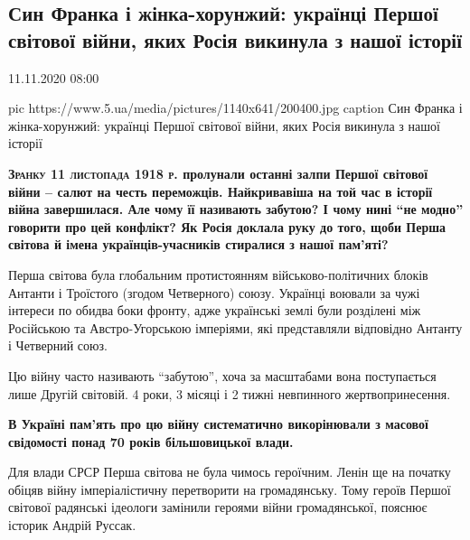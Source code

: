  
 
 

\subsection{Син Франка і жінка-хорунжий: українці Першої світової війни, яких Росія викинула з нашої історії}
11.11.2020 08:00



\ifcmt
pic https://www.5.ua/media/pictures/1140x641/200400.jpg
caption Син Франка і жінка-хорунжий: українці Першої світової війни, яких Росія викинула з нашої історії
\fi

{
\bfseries
\lettrine[lines=3]{З}{ранку 11 листопада 1918 р.} пролунали останні залпи Першої світової війни –
салют на честь переможців. Найкривавіша на той час в історії війна завершилася.
Але чому її називають забутою? І чому нині \enquote{не модно} говорити про цей
конфлікт? Як Росія доклала руку до того, щоби Перша світова й імена
українців-учасників стиралися з нашої пам'яті?
}

Перша світова була глобальним протистоянням військово-політичних блоків Антанти
і Троїстого (згодом Четверного) союзу. Українці воювали за чужі інтереси по
обидва боки фронту, адже українські землі були розділені між Російською та
Австро-Угорською імперіями, які представляли відповідно Антанту і Четверний
союз.

Цю війну часто називають \enquote{забутою}, хоча за масштабами вона поступається лише
Другій світовій. 4 роки, 3 місяці і 2 тижні невпинного жертвопринесення.

\begin{leftbar}
	\bfseries
В Україні пам'ять про цю війну систематично викорінювали з масової свідомості
понад 70 років більшовицької влади.
\end{leftbar}

Для влади СРСР Перша світова не була чимось героїчним. Ленін ще на початку
обіцяв війну імперіалістичну перетворити на громадянську. Тому героїв Першої
світової радянські ідеологи замінили героями війни громадянської, пояснює
історик Андрій Руссак.


